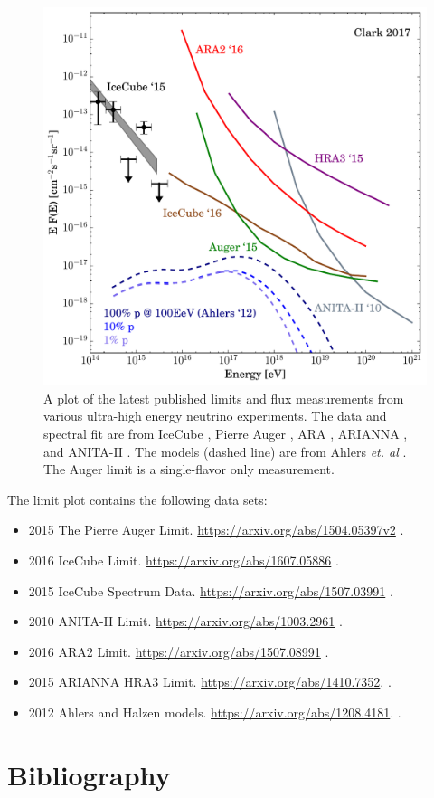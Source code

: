 \documentclass[preprint,12pt]{article}
\begin{document}
\begin{figure}[h]
\centering
\includegraphics[width=.9\textwidth]{leading_limits_plot.pdf}
\caption{A plot of the latest published limits and flux measurements from various ultra-high energy neutrino experiments. The data and spectral fit are from IceCube \cite{IceCube2015, IceCube2016}, Pierre Auger \cite{Auger2015}, ARA \cite{Ara2016}, ARIANNA \cite{Arriana2015}, and ANITA-II \cite{Anita2010Erratum}. The models (dashed line) are from Ahlers \textit{et. al} \cite{Ahlers2012}. The Auger limit is a single-flavor only measurement.}
\label{fig:sigcondblock1}
\end{figure}

\newpage

The limit plot contains the following data sets:

\begin{itemize}
\item 2015 The Pierre Auger Limit. \url{https://arxiv.org/abs/1504.05397v2} \cite{Auger2015}.
\item 2016 IceCube Limit. \url{https://arxiv.org/abs/1607.05886} \cite{IceCube2016}.
\item 2015 IceCube Spectrum Data. \url{https://arxiv.org/abs/1507.03991}  \cite{IceCube2015}.
\item 2010 ANITA-II Limit. \url{https://arxiv.org/abs/1003.2961} \cite{Anita2010, Anita2010Erratum}.
\item 2016 ARA2 Limit. \url{https://arxiv.org/abs/1507.08991} \cite{Ara2016}.
\item 2015 ARIANNA HRA3 Limit. \url{https://arxiv.org/abs/1410.7352}. \cite{Arriana2015}.
\item 2012 Ahlers and Halzen models. \url{https://arxiv.org/abs/1208.4181}. \cite{Ahlers2012}.
\end{itemize}

\section*{Bibliography}


 
\end{document}
